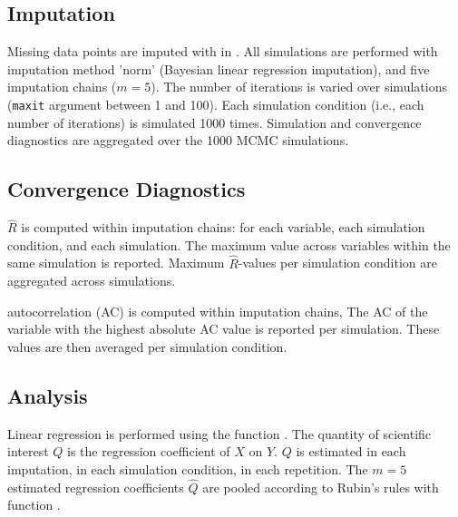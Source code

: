 \documentclass[article]{jss}
\newcommand{\fct}[1]{\code{#1()}}
\begin{document}
\subsection{Imputation}
Missing data points are imputed with  in . All simulations are performed with imputation method 'norm' (Bayesian linear regression imputation), and five imputation chains ($m = 5$). The number of iterations is varied over simulations (\texttt{maxit} argument between 1 and 100). Each simulation condition (i.e., each number of iterations) is simulated 1000 times. Simulation and convergence diagnostics are aggregated over the 1000 MCMC simulations. 

\subsection{Convergence Diagnostics}

$\widehat{R}$ is computed within imputation chains: for each variable, each simulation condition, and each simulation. The maximum value across variables within the same simulation is reported. Maximum $\widehat{R}$-values per simulation condition are aggregated across simulations.

autocorrelation (AC) is computed within imputation chains,  The AC of the variable with the highest absolute AC value is reported per simulation. These values are then averaged per simulation condition.


\subsection{Analysis}

Linear regression is performed using the  function \fct{lm}. The quantity of scientific interest $Q$ is the regression coefficient of $X$ on $Y$. $Q$ is estimated in each imputation, in each simulation condition, in each repetition. The $m = 5$ estimated regression coefficients $\hat{Q}$ are pooled according to Rubin's \citeyear{rubin87} rules with  function \fct{pool}.
\end{document}
